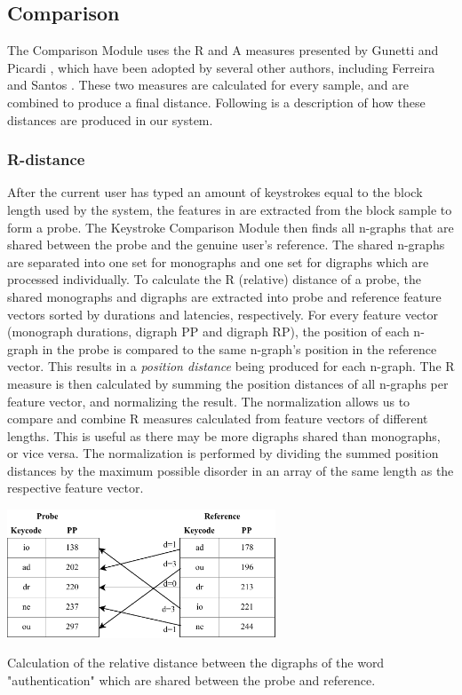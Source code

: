 \subsection{Comparison}
The Comparison Module uses the R and A measures presented by Gunetti and Picardi \cite{gnp}, which have been adopted by several other authors, including Ferreira and Santos \cite{superResults}.
These two measures are calculated for every sample, and are combined to produce a final distance.
Following is a description of how these distances are produced in our system.

\subsubsection{R-distance}

After the current user has typed an amount of keystrokes equal to the block length used by the system, the features in  are extracted from the block sample to form a probe.
The Keystroke Comparison Module then finds all n-graphs that are shared between the probe and the genuine user's reference.
The shared n-graphs are separated into one set for monographs and one set for digraphs which are processed individually.
To calculate the R (relative) distance of a probe, the shared monographs and digraphs are extracted into probe and reference feature vectors sorted by durations and latencies, respectively.
For every feature vector (monograph durations, digraph PP and digraph RP), the position of each n-graph in the probe is compared to the same n-graph's position in the reference vector.
This results in a \textit{position distance} being produced for each n-graph.
The R measure is then calculated by summing the position distances of all n-graphs per feature vector, and normalizing the result.
The normalization allows us to compare and combine R measures calculated from feature vectors of different lengths. This is useful as there may be more digraphs shared than monographs, or vice versa.
The normalization is performed by dividing the summed position distances by the maximum possible disorder in an array of the same length as the respective feature vector.

\begin{table}[h]
\centering
    \includegraphics[width=0.6\textwidth]{figures/R-measure_OC.pdf}
    \caption{Calculation of the relative distance between the digraphs of the word "authentication" which are shared between the probe and reference.}
    \label{fig:R-measure}
\end{table}

